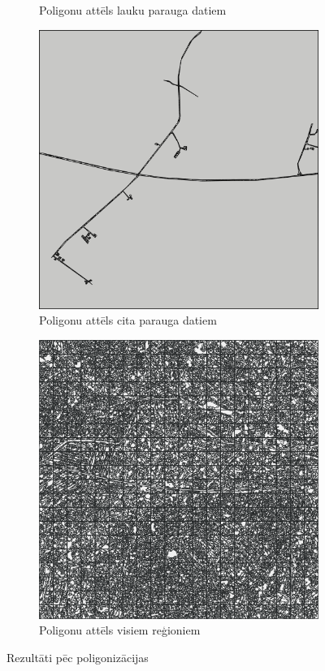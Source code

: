 \documentclass[12pt,paper=a4]{report}
\begin{document}
\begin{figure}[h!]
\begin{subfigure}[b]{.3\linewidth}
\caption{Poligonu attēls lauku parauga datiem}\label{fig:lauksPoly}
\end{subfigure}
\begin{subfigure}[b]{.3\linewidth}
\includegraphics[width=\linewidth]{citsPolygons}
\caption{Poligonu attēls cita parauga datiem}
\label{citsPoly}
\end{subfigure}
\begin{subfigure}[b]{.3\linewidth}
\includegraphics[width=\linewidth]{vissPolygons}
\caption{Poligonu attēls visiem reģioniem}\label{vissPoly}
\end{subfigure}
\caption{Rezultāti pēc poligonizācijas}
\label{fig:poly}
\end{figure}\par
\end{document}
